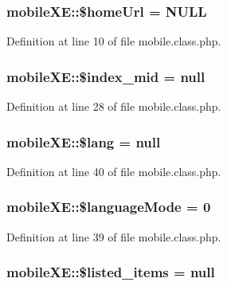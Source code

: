 \hypertarget{classmobileXE_abff078bb36c02394447e55be4500b762}{
\subsubsection[{\$home\+Url}]{\setlength{\rightskip}{0pt plus 5cm}mobile\+X\+E\+::\$home\+Url = N\+U\+L\+L}}\label{classmobileXE_abff078bb36c02394447e55be4500b762}


Definition at line 10 of file mobile.\+class.\+php.

\hypertarget{classmobileXE_a9e93ed38eed50085338e8128ab4015ab}{
\subsubsection[{\$index\+\_\+mid}]{\setlength{\rightskip}{0pt plus 5cm}mobile\+X\+E\+::\$index\+\_\+mid = null}}\label{classmobileXE_a9e93ed38eed50085338e8128ab4015ab}


Definition at line 28 of file mobile.\+class.\+php.

\hypertarget{classmobileXE_a126d781fe75edb57ef2718f5a6e26d82}{
\subsubsection[{\$lang}]{\setlength{\rightskip}{0pt plus 5cm}mobile\+X\+E\+::\$lang = null}}\label{classmobileXE_a126d781fe75edb57ef2718f5a6e26d82}


Definition at line 40 of file mobile.\+class.\+php.

\hypertarget{classmobileXE_a70ee01279ea1bcdd609905e80e4544b7}{
\subsubsection[{\$language\+Mode}]{\setlength{\rightskip}{0pt plus 5cm}mobile\+X\+E\+::\$language\+Mode = 0}}\label{classmobileXE_a70ee01279ea1bcdd609905e80e4544b7}


Definition at line 39 of file mobile.\+class.\+php.

\hypertarget{classmobileXE_abd07e5909154b43a31e2ebff5d51e4c7}{
\subsubsection[{\$listed\+\_\+items}]{\setlength{\rightskip}{0pt plus 5cm}mobile\+X\+E\+::\$listed\+\_\+items = null}}\label{classmobileXE_abd07e5909154b43a31e2ebff5d51e4c7}


